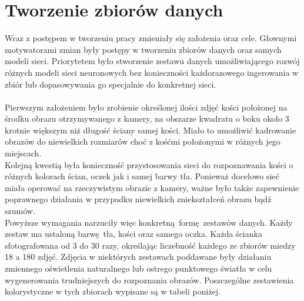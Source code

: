 
\chapter{Tworzenie zbiorów danych}

Wraz z postępem w tworzeniu pracy zmieniały się założenia oraz cele.
Głownymi motywatorami zmian były postępy w tworzeniu zbiorów danych oraz samych
modeli sieci. Priorytetem było stworzenie zestawu danych
umożliwiającego rozwój różnych modeli sieci neuronowych bez konieczności każdorazowego
ingerowania w zbiór lub dopasowywania go specjalnie do konkretnej sieci.\\\\
Pierwszym założeniem było zrobienie określonej ilości zdjęć kości położonej na środku
obrazu otrzymywanego z kamery, na obszarze kwadratu o boku około 3 krotnie większym
niż długość ściany samej kości. Miało to umożliwić kadrowanie obrazów
do niewielkich rozmiarów choć z kośćmi położonymi w różnych jego miejscach.\\
Kolejną kwestią była konieczność przystosowania sieci do rozpoznawania kości o
różnych kolorach ścian, oczek jak i samej barwy tła. Ponieważ docelowo sieć
miała operować na rzeczywistym obrazie z kamery, ważne było także zapewnienie poprawnego
działania w przypadku niewielkich zniekształceń obrazu bądź szumów.\\
Powyższe wymagania narzuciły więc konkretną formę zestawów danych.
Każdy zestaw ma ustaloną barwę tła, kości oraz samego oczka. Każda ścianka sfotografowana
od 3 do 30 razy, określając liczebność każdego ze zbiorów miedzy 18 a 180 zdjęć.
Zdjęcia w niektórych zestawach poddawane były działaniu zmiennego oświetlenia naturalnego
lub ostrego punktowego światła w celu wygenerowania trudniejszych do rozpoznania obrazów.
Poszczególne zestawienia kolorystyczne w tych zbiorach wypisane są w tabeli poniżej. \newpage

